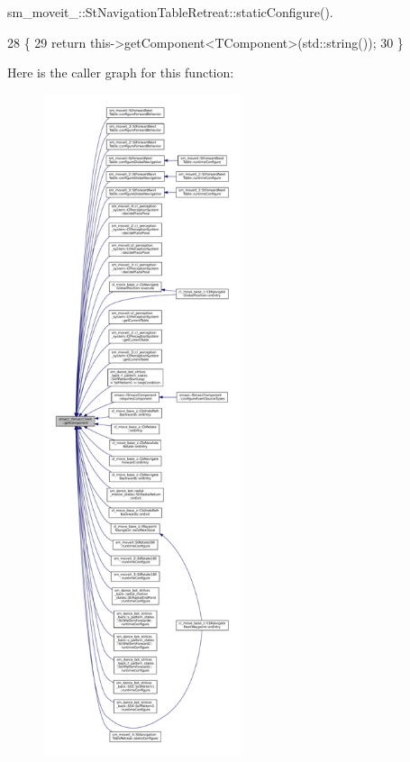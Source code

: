 sm\+\_\+moveit\+\_\+::\+St\+Navigation\+Table\+Retreat\+::static\+Configure().


\begin{DoxyCode}
28     \{
29         \textcolor{keywordflow}{return} this->getComponent<TComponent>(std::string());
30     \}
\end{DoxyCode}
Here is the caller graph for this function\+:
\nopagebreak
\begin{figure}[H]
\begin{center}
\leavevmode
\includegraphics[height=550pt]{classsmacc_1_1ISmaccClient_adef78db601749ca63c19e74a27cb88cc_icgraph}
\end{center}
\end{figure}
\mbox{\label{classsmacc_1_1ISmaccClient_ad72cba3ce7c5b3bd3977747dc6d5fb69}} 
